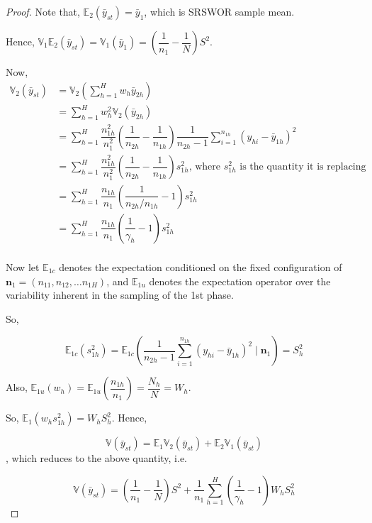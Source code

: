 \documentclass[12pt]{article}
\newcommand{\E}{\mathbb{E}}
\newcommand{\Var}{\mathbb{V}}
\theoremstyle{definition}
\begin{document}
\begin{proof}

Note that, $\E_2(\bar{y}_{st}) = \bar{y}_1$, which is SRSWOR sample mean. 

Hence, $\Var_1\E_2(\bar{y}_{st}) = \Var_1\left( \bar{y}_1 \right) = \left( \dfrac{1}{n_1} - \dfrac{1}{N}\right)S^2$.

Now, 
\begin{align*}
    \Var_2\left( \bar{y}_{st} \right) & = \Var_2 \left( \sum_{h = 1}^{H}w_h \bar{y}_{2h} \right)\\
    & = \sum_{h = 1}^{H} w_h^2 \Var_2(\bar{y}_{2h})\\
    & = \sum_{h = 1}^{H} \dfrac{n_{1h}^2}{n_1^2} \left( \dfrac{1}{n_{2h}} - \dfrac{1}{n_{1h}} \right) \dfrac{1}{n_{2h} - 1} \sum_{i = 1}^{n_{1h}} \left(y_{hi} - \bar{y}_{1h}\right)^2\\
    & = \sum_{h = 1}^{H} \dfrac{n_{1h}^2}{n_1^2} \left( \dfrac{1}{n_{2h}} - \dfrac{1}{n_{1h}} \right) s_{1h}^2 \text{, where } s_{1h}^2 \text{ is the quantity it is replacing}\\
    & = \sum_{h = 1}^{H} \dfrac{n_{1h}}{n_1} \left( \dfrac{1}{n_{2h} / n_{1h}} - 1 \right) s_{1h}^2\\
    & = \sum_{h = 1}^{H} \dfrac{n_{1h}}{n_1} \left( \dfrac{1}{\gamma_h} - 1 \right) s_{1h}^2\\
\end{align*}

Now let $\E_{1c}$ denotes the expectation conditioned on the fixed configuration of $\mathbf{n}_1 = \left(n_{11}, n_{12}, \dots n_{1H}\right)$, and $\E_{1u}$ denotes the expectation operator over the variability inherent in the sampling of the 1st phase.

So, 

$$\E_{1c}(s_{1h}^2) = \E_{1c}\left( \dfrac{1}{n_{2h} - 1} \sum_{i = 1}^{n_{1h}} \left(y_{hi} - \bar{y}_{1h}\right)^2 \mid \mathbf{n}_1 \right) = S_h^2$$

Also, $\E_{1u}(w_h) = \E_{1u}\left( \dfrac{n_{1h}}{n_1} \right) = \dfrac{N_h}{N} = W_h$.

So, $\E_1(w_h s_{1h}^2) = W_hS_h^2$. Hence,

$$\Var(\bar{y}_{st}) = \E_1\Var_2(\bar{y}_{st}) + \E_2\Var_1(\bar{y}_{st})$$, which reduces to the above quantity, i.e.

$$\Var(\bar{y}_{st}) = \left( \dfrac{1}{n_1} - \dfrac{1}{N} \right)S^2 + \dfrac{1}{n_1} \sum_{h=1}^{H} \left(\dfrac{1}{\gamma_h} - 1\right) W_h S_h^2$$

\end{proof}
\end{document}
